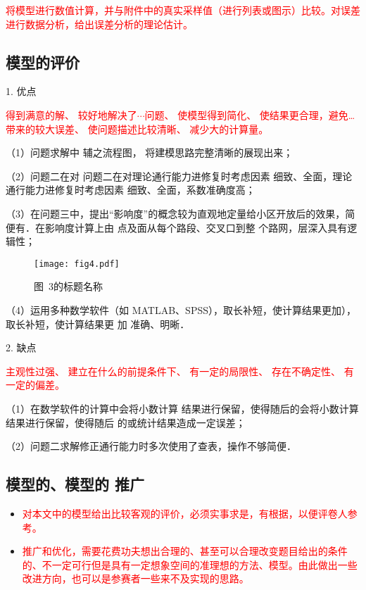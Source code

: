\documentclass[12pt,a4paper]{nmmcm}
\begin{document}
\textcolor{red}{将模型进行数值计算，并与附件中的真实采样值（进行列表或图示）比较。对误差进行数据分析，给出误差分析的理论估计。}

\subsection{模型的评价}


1. 优点

\textcolor{red}{得到满意的解、
  较好地解决了$\cdots$问题、
  使模型得到简化、
  使结果更合理，避免…带来的较大误差、
  使问题描述比较清晰、
  减少大的计算量。
}

（1）问题求解中 辅之流程图， 将建模思路完整清晰的展现出来；

（2）问题二在对 问题二在对理论通行能力进修复时考虑因素 细致、全面，理论通行能力进修复时考虑因素
细致、全面，系数准确度高；

（3）在问题三中，提出“影响度”的概念较为直观地定量给小区开放后的效果，简便有．在影响度计算上由
点及面从每个路段、交叉口到整 个路网，层深入具有逻辑性；

\begin{figure}[h!t]
  \centerline{\texttt{[image: fig4.pdf]}}
  \caption{\song\wuhao 图~3的标题名称}
\end{figure}


（4）运用多种数学软件（如 MATLAB、SPSS），取长补短，使计算结果更加），取长补短，使计算结果更
加 准确、明晰．

2. 缺点

\textcolor{red}{主观性过强、
  建立在什么的前提条件下、
  有一定的局限性、
  存在不确定性、
  有一定的偏差。
}

（1）在数学软件的计算中会将小数计算 结果进行保留，使得随后的会将小数计算 结果进行保留，使得随后
的或统计结果造成一定误差；

（2）问题二求解修正通行能力时多次使用了查表，操作不够简便．

\subsection{模型的、模型的 推广}

\begin{itemize}

  \item \textcolor{red}{对本文中的模型给出比较客观的评价，必须实事求是，有根据，以便评卷人参考。}

  \item \textcolor{red}{推广和优化，需要花费功夫想出合理的、甚至可以合理改变题目给出的条件的、不一定可行但是具有一定想象空间的准理想的方法、模型。由此做出一些改进方向，也可以是参赛者一些来不及实现的思路。}
\end{itemize}
\end{document}
